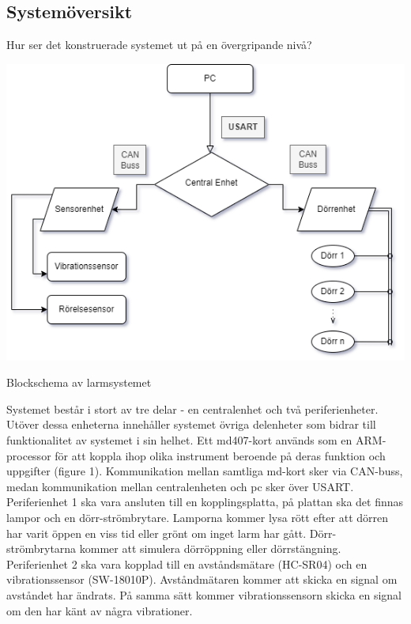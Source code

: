 \documentclass{article}
\begin{document}
\subsection{Systemöversikt}
Hur ser det konstruerade systemet ut på en övergripande nivå?


\includegraphics[scale=0.8]{Projektrapport/diagram.png}
\caption {Blockschema av larmsystemet}
\label{fig:drawing}


Systemet består i stort av tre delar - en centralenhet och två periferienheter. 
Utöver dessa enheterna innehåller systemet övriga delenheter som bidrar till funktionalitet av systemet i sin helhet. 
Ett md407-kort används som en ARM-processor för att koppla ihop olika instrument beroende på deras funktion och uppgifter (figure 1).
Kommunikation mellan samtliga md-kort sker via CAN-buss, medan kommunikation mellan centralenheten och pc sker över USART. \\


Periferienhet 1 ska vara ansluten till en kopplingsplatta, på plattan ska det finnas lampor och en dörr-strömbrytare. 
Lamporna kommer lysa rött efter att dörren har varit öppen en viss tid eller grönt om inget larm har gått. 
Dörr-strömbrytarna kommer att simulera dörröppning eller dörrstängning. \\

Periferienhet 2 ska vara kopplad till en avståndsmätare (HC-SR04) och en vibrationssensor (SW-18010P). 
Avståndmätaren kommer att skicka en signal om avståndet har ändrats. 
På samma sätt kommer vibrationssensorn skicka en signal om den har känt av några vibrationer. \\
\end{document}
